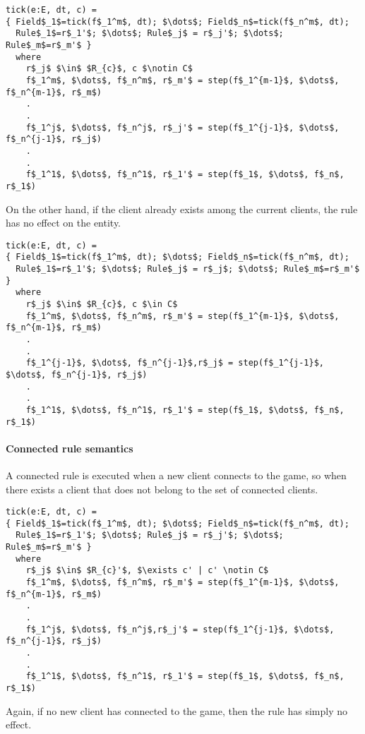 \begin{lstlisting}[mathescape]
tick(e:E, dt, c) =
{ Field$_1$=tick(f$_1^m$, dt); $\dots$; Field$_n$=tick(f$_n^m$, dt);
  Rule$_1$=r$_1'$; $\dots$; Rule$_j$ = r$_j'$; $\dots$; Rule$_m$=r$_m'$ }
  where
    r$_j$ $\in$ $R_{c}$, c $\notin C$
    f$_1^m$, $\dots$, f$_n^m$, r$_m'$ = step(f$_1^{m-1}$, $\dots$, f$_n^{m-1}$, r$_m$)
    .
    .
    f$_1^j$, $\dots$, f$_n^j$, r$_j'$ = step(f$_1^{j-1}$, $\dots$, f$_n^{j-1}$, r$_j$)
    .
    .
    f$_1^1$, $\dots$, f$_n^1$, r$_1'$ = step(f$_1$, $\dots$, f$_n$, r$_1$)
\end{lstlisting}

\noindent
On the other hand, if the client already exists among the current clients, the rule has no effect on the entity.

\begin{lstlisting}[mathescape]
tick(e:E, dt, c) =
{ Field$_1$=tick(f$_1^m$, dt); $\dots$; Field$_n$=tick(f$_n^m$, dt);
  Rule$_1$=r$_1'$; $\dots$; Rule$_j$ = r$_j$; $\dots$; Rule$_m$=r$_m'$ }
  where
    r$_j$ $\in$ $R_{c}$, c $\in C$
    f$_1^m$, $\dots$, f$_n^m$, r$_m'$ = step(f$_1^{m-1}$, $\dots$, f$_n^{m-1}$, r$_m$)
    .
    .
    f$_1^{j-1}$, $\dots$, f$_n^{j-1}$,r$_j$ = step(f$_1^{j-1}$, $\dots$, f$_n^{j-1}$, r$_j$)
    .
    .
    f$_1^1$, $\dots$, f$_n^1$, r$_1'$ = step(f$_1$, $\dots$, f$_n$, r$_1$)
\end{lstlisting}

\paragraph{Connected rule semantics}
A connected rule is executed when a new client connects to the game, so when there exists a client that does not belong to the set of connected clients.

\begin{lstlisting}[mathescape]
tick(e:E, dt, c) =
{ Field$_1$=tick(f$_1^m$, dt); $\dots$; Field$_n$=tick(f$_n^m$, dt);
  Rule$_1$=r$_1'$; $\dots$; Rule$_j$ = r$_j'$; $\dots$; Rule$_m$=r$_m'$ }
  where
    r$_j$ $\in$ $R_{c}'$, $\exists c' | c' \notin C$
    f$_1^m$, $\dots$, f$_n^m$, r$_m'$ = step(f$_1^{m-1}$, $\dots$, f$_n^{m-1}$, r$_m$)
    .
    .
    f$_1^j$, $\dots$, f$_n^j$,r$_j'$ = step(f$_1^{j-1}$, $\dots$, f$_n^{j-1}$, r$_j$)
    .
    .
    f$_1^1$, $\dots$, f$_n^1$, r$_1'$ = step(f$_1$, $\dots$, f$_n$, r$_1$)
\end{lstlisting}

\noindent
Again, if no new client has connected to the game, then the rule has simply no effect.

